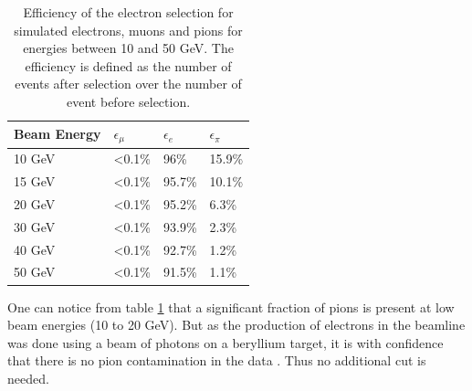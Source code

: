 \begin{table}[htb!]
	\centering
	\caption{Efficiency of the electron selection for simulated electrons, muons and pions for energies between 10 and 50 GeV. The efficiency is defined as the number of events after selection over the number of event before selection.}
	\label{table:eff_electron}
	\begin{tabular}{@{} llll @{}}
		\toprule
		\textbf{Beam Energy} & \textbf{$\epsilon_{\mu}$} & \textbf{$\epsilon_{e}$} & \textbf{$\epsilon_{\pi}$}\\
		\midrule
		10 GeV & <0.1\% & 96\% & 15.9\%\\
		15 GeV & <0.1\% & 95.7\% & 10.1\%\\
		20 GeV & <0.1\% & 95.2\% & 6.3\%\\
		30 GeV & <0.1\% & 93.9\% & 2.3\%\\
		40 GeV & <0.1\% & 92.7\% & 1.2\%\\
		50 GeV & <0.1\% & 91.5\% & 1.1\%\\
		\bottomrule
	\end{tabular}
\end{table}

One can notice from table \ref{table:eff_electron} that a significant fraction of pions is present at low beam energies (10 to 20 GeV). But as the production of electrons in the beamline was done using a beam of photons on a beryllium target, it is with confidence that there is no pion contamination in the data \cite{AmbraEnergy}. Thus no additional cut is needed.

